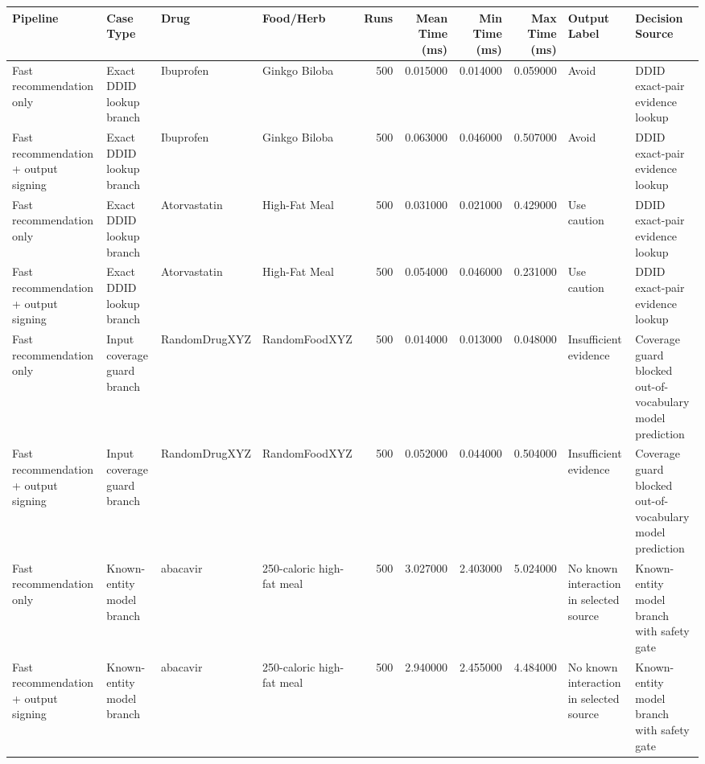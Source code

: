 \begin{tabular}{llllrrrrll}
\toprule
Pipeline & Case Type & Drug & Food/Herb & Runs & Mean Time (ms) & Min Time (ms) & Max Time (ms) & Output Label & Decision Source \\
\midrule
Fast recommendation only & Exact DDID lookup branch & Ibuprofen & Ginkgo Biloba & 500 & 0.015000 & 0.014000 & 0.059000 & Avoid & DDID exact-pair evidence lookup \\
Fast recommendation + output signing & Exact DDID lookup branch & Ibuprofen & Ginkgo Biloba & 500 & 0.063000 & 0.046000 & 0.507000 & Avoid & DDID exact-pair evidence lookup \\
Fast recommendation only & Exact DDID lookup branch & Atorvastatin & High-Fat Meal & 500 & 0.031000 & 0.021000 & 0.429000 & Use caution & DDID exact-pair evidence lookup \\
Fast recommendation + output signing & Exact DDID lookup branch & Atorvastatin & High-Fat Meal & 500 & 0.054000 & 0.046000 & 0.231000 & Use caution & DDID exact-pair evidence lookup \\
Fast recommendation only & Input coverage guard branch & RandomDrugXYZ & RandomFoodXYZ & 500 & 0.014000 & 0.013000 & 0.048000 & Insufficient evidence & Coverage guard blocked out-of-vocabulary model prediction \\
Fast recommendation + output signing & Input coverage guard branch & RandomDrugXYZ & RandomFoodXYZ & 500 & 0.052000 & 0.044000 & 0.504000 & Insufficient evidence & Coverage guard blocked out-of-vocabulary model prediction \\
Fast recommendation only & Known-entity model branch & abacavir & 250-caloric high-fat meal & 500 & 3.027000 & 2.403000 & 5.024000 & No known interaction in selected source & Known-entity model branch with safety gate \\
Fast recommendation + output signing & Known-entity model branch & abacavir & 250-caloric high-fat meal & 500 & 2.940000 & 2.455000 & 4.484000 & No known interaction in selected source & Known-entity model branch with safety gate \\
\bottomrule
\end{tabular}
